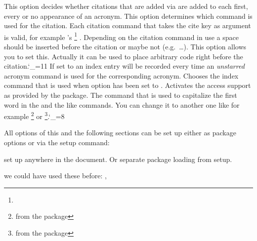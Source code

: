 \documentclass[DIV10,toc=index,toc=bib,hyperfootnotes=false]{cnpkgdoc}
\makeatletter
\newcommand*\sinceversion[1]{%
  \@bsphack
  \marginnote{%
    \footnotesize\sffamily\RaggedRight
    \textcolor{black!75}{Introduced in version~#1}}%
  \@esphack}
\makeatother
\begin{document}
\begin{beschreibung}
   This option decides whether citations that are added via 
   are added to each first, every or no appearance of an acronym.
   This option determines which command is used for the citation. Each citation
   command that takes the cite key as argument is valid, for example 's%
   \footnote{} .
   Depending on the citation command in use a space should be inserted before the
   citation or maybe not (e.g.\ \ldots). This option allows you to
   set this. Actually it can be used to place arbitrary code right before the
   citation.\catcode`\_=11
   \sinceversion{1.1}If set to  an index entry will be recorded
   every time an \emph{unstarred} acronym command is used for the corresponding
   acronym.
   \sinceversion{1.1}Chooses the index command that is used when option 
   has been set to .
   \sinceversion{1.0}Activates the access support as provided by the 
    package.
   The command that is used to capitalize the first word in the  and the
   like commands. You can change it to another one like for example
   \footnote{from the  package} or
   \footnote{from the  package}.\catcode`\_=8
\end{beschreibung}

All options of this and the following sections can be set up either as package
options or via the setup command:
\begin{beschreibung}
 \newline
   set up \acro anywhere in the document. Or separate package loading from setup.
\end{beschreibung}

\begin{beispiel}
 we could have used these before: \nato, \ny
\end{beispiel}
\end{document}

